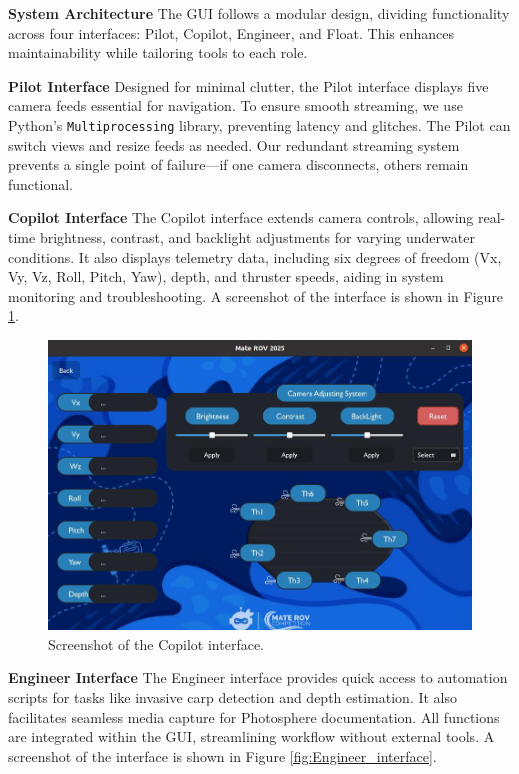 \vspace{0.2cm}
\textbf{System Architecture}
The GUI follows a modular design, dividing functionality across four interfaces: Pilot, Copilot, Engineer, and Float. This enhances maintainability while tailoring tools to each role.

\vspace{0.2cm}
\textbf{Pilot Interface}
Designed for minimal clutter, the Pilot interface displays five camera feeds essential for navigation. To ensure smooth streaming, we use Python's \texttt{Multiprocessing} library, preventing latency and glitches. The Pilot can switch views and resize feeds as needed. Our redundant streaming system prevents a single point of failure—if one camera disconnects, others remain functional. 

\vspace{0.2cm}
\textbf{Copilot Interface}
The Copilot interface extends camera controls, allowing real-time brightness, contrast, and backlight adjustments for varying underwater conditions. It also displays telemetry data, including six degrees of freedom (Vx, Vy, Vz, Roll, Pitch, Yaw), depth, and thruster speeds, aiding in system monitoring and troubleshooting. A screenshot of the interface is shown in Figure \ref{fig:copilot_interface}.

\begin{figure}[ht]
    \centering
    \includegraphics[width=0.8\columnwidth]{Sections/2Design Rationale/images/Copilot_interface.jpeg}
    \caption{Screenshot of the Copilot interface.}
    \label{fig:copilot_interface}
\end{figure}

\vspace{0.2cm}
\textbf{Engineer Interface}
The Engineer interface provides quick access to automation scripts for tasks like invasive carp detection and depth estimation. It also facilitates seamless media capture for Photosphere documentation. All functions are integrated within the GUI, streamlining workflow without external tools. A screenshot of the interface is shown in Figure \ref{fig:Engineer_interface}.


